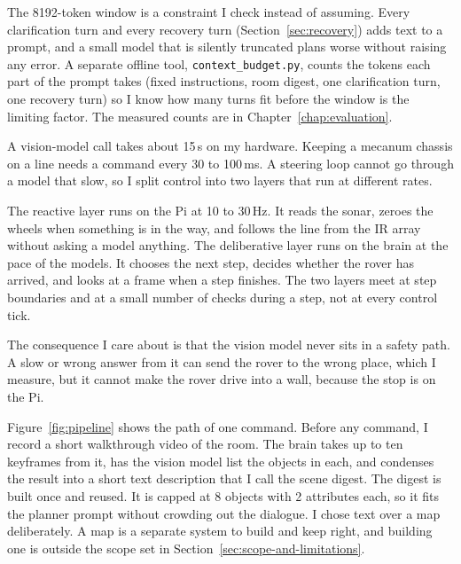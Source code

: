 The 8192-token window is a constraint I check instead of assuming. Every
clarification turn and every recovery turn (Section~\ref{sec:recovery}) adds text
to a prompt, and a small model that is silently truncated plans worse without
raising any error. A separate offline tool, \texttt{context\_budget.py}, counts
the tokens each part of the prompt takes (fixed instructions, room digest, one
clarification turn, one recovery turn) so I know how many turns fit before the
window is the limiting factor. The measured counts are in
Chapter~\ref{chap:evaluation}.

\label{ssec:rates}

A vision-model call takes about 15\,s on my hardware. Keeping a mecanum chassis
on a line needs a command every 30 to 100\,ms. A steering loop cannot go through
a model that slow, so I split control into two layers that run at different rates.

The reactive layer runs on the Pi at 10 to 30\,Hz. It reads the sonar, zeroes the
wheels when something is in the way, and follows the line from the IR array
without asking a model anything. The deliberative layer runs on the brain at the
pace of the models. It chooses the next step, decides whether the rover has
arrived, and looks at a frame when a step finishes. The two layers meet at step
boundaries and at a small number of checks during a step, not at every control
tick.

The consequence I care about is that the vision model never sits in a safety
path. A slow or wrong answer from it can send the rover to the wrong place, which
I measure, but it cannot make the rover drive into a wall, because the stop is on
the Pi.

\label{ssec:pipeline}

Figure~\ref{fig:pipeline} shows the path of one command. Before any command, I
record a short walkthrough video of the room. The brain takes up to ten
keyframes from it, has the vision model list the objects in each, and condenses
the result into a short text description that I call the scene digest. The digest
is built once and reused. It is capped at 8 objects with 2 attributes each, so it
fits the planner prompt without crowding out the dialogue. I chose text over a
map deliberately. A map is a separate system to build and keep right, and
building one is outside the scope set in Section~\ref{sec:scope-and-limitations}.

